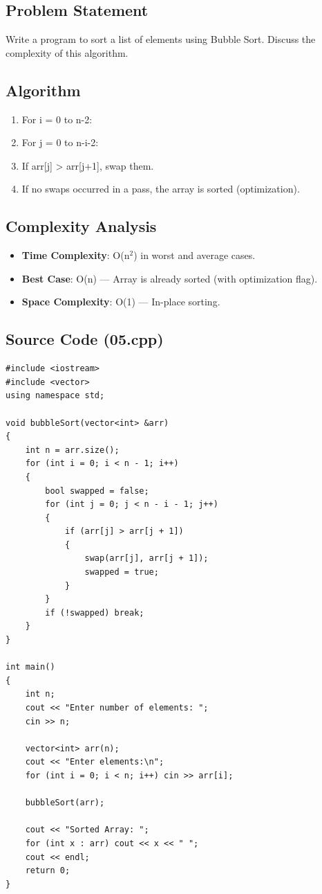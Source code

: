 \documentclass[a4paper,12pt]{article}
\begin{document}
\subsection*{Problem Statement}
Write a program to sort a list of elements using Bubble Sort. Discuss the complexity of this algorithm.

\subsection*{Algorithm}
\begin{enumerate}
    \item For i = 0 to n-2:
    \item   For j = 0 to n-i-2:
    \item     If arr[j] > arr[j+1], swap them.
    \item   If no swaps occurred in a pass, the array is sorted (optimization).
\end{enumerate}

\subsection*{Complexity Analysis}
\begin{itemize}
    \item \textbf{Time Complexity}: O(n$^2$) in worst and average cases.
    \item \textbf{Best Case}: O(n) — Array is already sorted (with optimization flag).
    \item \textbf{Space Complexity}: O(1) — In-place sorting.
\end{itemize}

\subsection*{Source Code (05.cpp)}
\begin{lstlisting}[style=cppstyle]
#include <iostream>
#include <vector>
using namespace std;

void bubbleSort(vector<int> &arr)
{
    int n = arr.size();
    for (int i = 0; i < n - 1; i++)
    {
        bool swapped = false;
        for (int j = 0; j < n - i - 1; j++)
        {
            if (arr[j] > arr[j + 1])
            {
                swap(arr[j], arr[j + 1]);
                swapped = true;
            }
        }
        if (!swapped) break;
    }
}

int main()
{
    int n;
    cout << "Enter number of elements: ";
    cin >> n;

    vector<int> arr(n);
    cout << "Enter elements:\n";
    for (int i = 0; i < n; i++) cin >> arr[i];

    bubbleSort(arr);

    cout << "Sorted Array: ";
    for (int x : arr) cout << x << " ";
    cout << endl;
    return 0;
}
\end{lstlisting}
\end{document}

